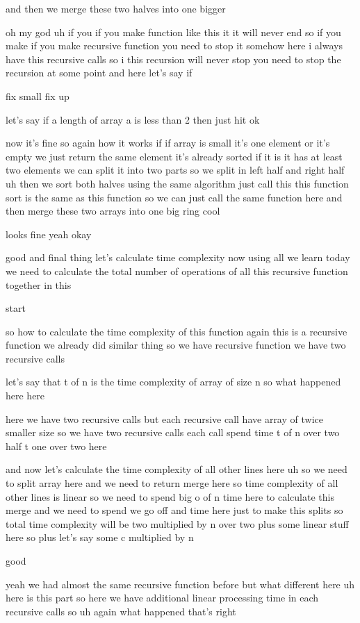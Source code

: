 and then we merge these two halves into one bigger

oh my god uh if you if you make function like this it it will never end so if you make if you make recursive function you need to stop it somehow here i always have this recursive calls so i this recursion will never stop you need to stop the recursion at some point and here let's say if

fix small fix up

let's say if a length of array a is less than 2 then just hit ok

now it's fine so again how it works if if array is small it's one element or it's empty we just return the same element it's already sorted if it is it has at least two elements we can split it into two parts so we split in left half and right half uh then we sort both halves using the same algorithm just call this this function sort is the same as this function so we can just call the same function here and then merge these two arrays into one big ring cool

looks fine yeah okay

good and final thing let's calculate time complexity now using all we learn today we need to calculate the total number of operations of all this recursive function together in this

start

so how to calculate the time complexity of this function again this is a recursive function we already did similar thing so we have recursive function we have two recursive calls

let's say that t of n is the time complexity of array of size n so what happened here here

here we have two recursive calls but each recursive call have array of twice smaller size so we have two recursive calls each call spend time t of n over two half t one over two here

and now let's calculate the time complexity of all other lines here uh so we need to split array here and we need to return merge here so time complexity of all other lines is linear so we need to spend big o of n time here to calculate this merge and we need to spend we go off and time here just to make this splits so total time complexity will be two multiplied by n over two plus some linear stuff here so plus let's say some c multiplied by n

good

yeah we had almost the same recursive function before but what different here uh here is this part so here we have additional linear processing time in each recursive calls so uh again what happened that's right

